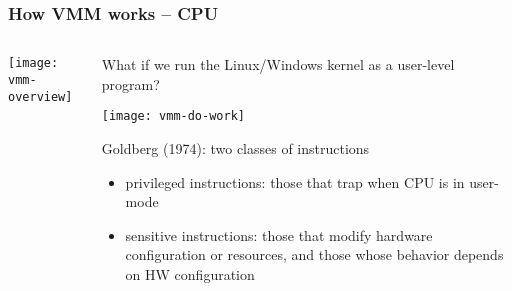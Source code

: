 \begin{frame}[plain]
	\frametitle{How VMM works  -- CPU}
	
	
	
	\begin{columns}
		
		\begin{column}{.25\textwidth}
			
			\texttt{[image: vmm-overview]}
			
		\end{column}
		
		\begin{column}{.75\textwidth}
			
			What if we run the Linux/Windows kernel as a user-level program?	
			
			\centering
			\texttt{[image: vmm-do-work]}	
			\begin{flushleft}
				Goldberg (1974):  two classes of instructions 
			\end{flushleft}
			\begin{itemize}
				\item privileged instructions:   those that trap when CPU is in user-mode  
				\item sensitive instructions:   those that modify hardware configuration or resources, and those whose behavior depends on HW configuration 
				
			\end{itemize} 
			
		\end{column}
		
		
	\end{columns}
	
	
\end{frame}


